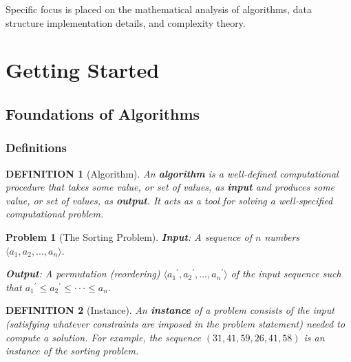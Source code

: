 \documentclass[12pt]{article}
\theoremstyle{blueplain}
\theoremstyle{bluedef}
\newtheorem{definition}{DEFINITION}[section]
\newtheorem{problem}{Problem}[section]
\theoremstyle{blueremark}
\begin{document}
\medskip

\noindent Specific focus is placed on the mathematical analysis of algorithms, data structure implementation details, and complexity theory.

\clearpage

\label{mytoc}

\onehalfspacing
\tableofcontents
\clearpage

\doublespacing
{}


\section{Getting Started}

\subsection{Foundations of Algorithms}

\subsubsection{Definitions}

\begin{definition}[Algorithm]
    An \textbf{algorithm} is a well-defined computational procedure that takes some value, or set of values, as \textbf{input} and produces some value, or set of values, as \textbf{output}. It acts as a tool for solving a well-specified computational problem.
\end{definition}

\begin{problem}[The Sorting Problem]
\textbf{Input}: A sequence of $n$ numbers $\langle a_{1},a_{2},...,a_{n}\rangle$.

\noindent \textbf{Output}: A permutation (reordering) $\langle{a_{1}}^{\prime},{a_{2}}^{\prime},...,{a_{n}}^{\prime}\rangle$ of the input sequence such that ${a_{1}}^{\prime}\le{a_{2}}^{\prime}\le\cdot\cdot\cdot\le{a_{n}}$.
\end{problem}

\begin{definition}[Instance]
    An \textbf{instance} of a problem consists of the input (satisfying whatever constraints are imposed in the problem statement) needed to compute a solution.
    For example, the sequence $(31, 41, 59, 26, 41, 58)$ is an instance of the sorting problem.
\end{definition}
\end{document}
